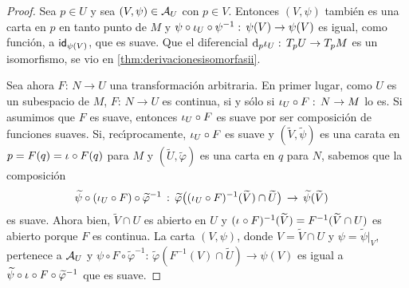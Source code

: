 \begin{proof}
	Sea $p\in U$ y sea $(V,\psi)\in\cal{A}_{U}$ con $p\in V$.
	Entonces $(V,\psi)$ tambi\'{e}n es una carta en $p$ en tanto
	punto de $M$ y $\psi\circ\inc[U]\circ\psi^{-1}:\,%
	\psi(V)\rightarrow\psi(V)$ es igual, como funci\'{o}n, a
	$\id[\psi(V)]$, que es suave. Que el diferencial
	$\diferencial[p]{\inc[U]}:\,T_{p}U\rightarrow T_{p}M$ es un
	isomorfismo, se vio en \ref{thm:derivacionesisomorfasii}.

	Sea ahora $F:\,N\rightarrow U$ una transformaci\'{o}n arbitraria.
	En primer lugar, como $U$ es un subespacio de $M$,
	$F:\,N\rightarrow U$ es continua, si y s\'{o}lo si
	$\inc[U]\circ F:\,N\rightarrow M$ lo es. Si asumimos que $F$ es
	suave, entonces $\inc[U]\circ F$ es suave por ser composici\'{o}n
	de funciones suaves. Si, rec\'{\i}procamente, $\inc[U]\circ F$ es
	suave y $(\widetilde{V},\widetilde{\psi})$ es una carata en
	$p=F(q)=\inc\circ F(q)$ para $M$ y
	$(\widetilde{U},\widetilde{\varphi})$ es una carta en $q$ para $N$,
	sabemos que la composici\'{o}n
	\begin{align*}
		\widetilde{\psi}\circ (\inc[U]\circ F)\circ
			\widetilde{\varphi}^{-1} & \,:\,
			\widetilde{\varphi}\big(
			(\inc[U]\circ F)^{-1}(\widetilde{V})\cap\widetilde{U}
			\big)\,\rightarrow\,\widetilde{\psi}(\widetilde{V})
	\end{align*}
	es suave. Ahora bien, $\widetilde{V}\cap U$ es abierto en $U$ y
	$(\inc\circ F)^{-1}(\widetilde{V})=F^{-1}(\widetilde{V}\cap U)$ es
	abierto porque $F$ es continua. La carta $(V,\psi)$, donde
	$V=\widetilde{V}\cap U$ y $\psi=\widetilde{\psi}|_{V}$, pertenece
	a $\cal{A}_{U}$ y $\psi\circ F\circ\widetilde{\varphi}^{-1}:\,%
	\widetilde{\varphi}(F^{-1}(V)\cap\widetilde{U})\rightarrow\psi(V)$
	es igual a
	$\widetilde{\psi}\circ\inc\circ F\circ\widetilde{\varphi}^{-1}$
	que es suave.
\end{proof}

